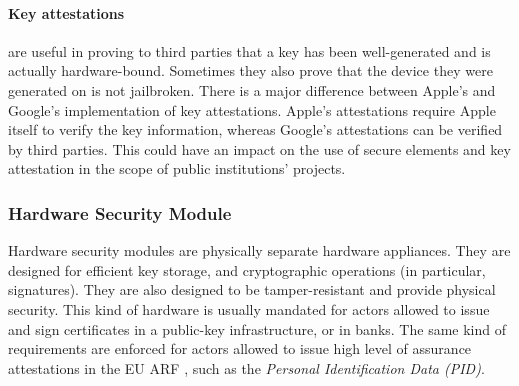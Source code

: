 \paragraph{Key attestations} are useful in proving to third parties that a key has been well-generated and is actually hardware-bound. Sometimes they also prove that the device they were generated on is not jailbroken. There is a major difference between Apple's and Google's implementation of key attestations. Apple's attestations require Apple itself to verify the key information, whereas Google's attestations can be verified by third parties. This could have an impact on the use of secure elements and key attestation in the scope of public institutions' \eid projects.

\subsubsection{Hardware Security Module} 

Hardware security modules are physically separate hardware appliances. They are designed for efficient key storage, and cryptographic operations (in particular, signatures). They are also designed to be tamper-resistant and provide physical security. This kind of hardware is usually mandated for actors allowed to issue and sign certificates in a public-key infrastructure, or in banks. The same kind of requirements are enforced for actors allowed to issue high level of assurance attestations in the EU ARF \cite{EUDI-ARF}, such as the \emph{Personal Identification Data (PID)}.

